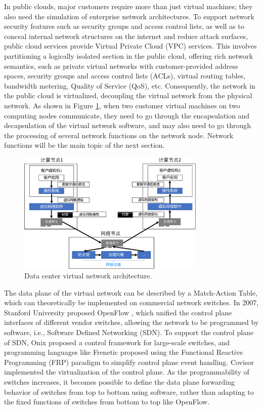 In public clouds, major customers require more than just virtual machines; they also need the simulation of enterprise network architectures. To support network security features such as security groups and access control lists, as well as to conceal internal network structures on the internet and reduce attack surfaces, public cloud services provide Virtual Private Cloud (VPC) services. This involves partitioning a logically isolated section in the public cloud, offering rich network semantics, such as private virtual networks with customer-provided address spaces, security groups and access control lists (ACLs), virtual routing tables, bandwidth metering, Quality of Service (QoS), etc. Consequently, the network in the public cloud is virtualized, decoupling the virtual network from the physical network. As shown in Figure \ref{background:fig:network-architecture}, when two customer virtual machines on two computing nodes communicate, they need to go through the encapsulation and decapsulation of the virtual network software, and may also need to go through the processing of several network functions on the network node. Network functions will be the main topic of the next section.

\begin{figure}[htbp]
	\centering
	\includegraphics[width=0.8\textwidth]{figures/VPC_arch.pdf}
	\caption{Data center virtual network architecture.}
	\label{background:fig:network-architecture}
\end{figure}

The data plane of the virtual network can be described by a Match-Action Table, which can theoretically be implemented on commercial network switches. In 2007, Stanford University proposed OpenFlow \cite{mckeown2008openflow}, which unified the control plane interfaces of different vendor switches, allowing the network to be programmed by software, i.e., Software Defined Networking (SDN). To support the control plane of SDN, Onix \cite{koponen2010onix} proposed a control framework for large-scale switches, and programming languages like Frenetic \cite{voellmy2010nettle,foster2011frenetic} proposed using the Functional Reactive Programming (FRP) paradigm to simplify control plane event handling. Covisor \cite{jin2015covisor} implemented the virtualization of the control plane. As the programmability of switches increases, it becomes possible to define the data plane forwarding behavior of switches from top to bottom using software, rather than adapting to the fixed functions of switches from bottom to top like OpenFlow.

